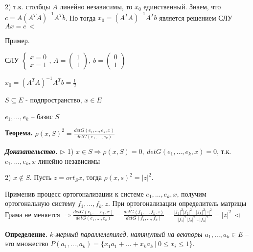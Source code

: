 \vspace{\baselineskip}
2) т.к. столбцы $A$ линейно независимы, то $x_0$ единственный. Знаем, что $c = A (A^T A)^{-1} A^T b$. Но тогда $x_0 = (A^T A)^{-1} A^T b$ является решением СЛУ $Ax = c \ \lhd$

\vspace{\baselineskip}
Пример.

СЛУ $\begin{cases}
		x = 0 \\
		x = 1
	\end{cases}$, $A = \begin{pmatrix} 1 \\ 1 \end{pmatrix}, \ b = \begin{pmatrix} 0 \\ 1 \end{pmatrix}$

\vspace{\baselineskip}
$x_0 = (A^T A)^{-1} A^T b = \frac{1}{2}$

\vspace{\baselineskip}
$S \subseteq E$ - подпространство, $x \in E$

$e_1, \dots, e_k$ -- базис $S$

\vspace{\baselineskip}
\textbf{Теорема.} $\rho (x, S)^2 = \frac{det G(e_1, \dots, e_k, x)}{det G(e_1, \dots, e_k)}$

\vspace{\baselineskip}
\textbf{\textit{Доказательство.}} $\rhd$ 1) $x \in S \Rightarrow \rho (x, S) = 0, \ det G(e_1, \dots, e_k, x) = 0$, т.к. $e_1, \dots, e_k, x$ линейно независимы

\vspace{\baselineskip}
2) $x \notin S$. Пусть $z = ort_S x$, тогда $\rho(x, s)^2 = |z|^2$.

Применив процесс ортогонализации к системе $e_1, \dots, e_k, x$, получим ортогональную систему $f_1, \dots, f_k, z$. При ортогонализации определитель матрицы Грама не меняется $\Rightarrow \frac{det G(e_1, \dots, e_k, x)}{det G(e_1, \dots, e_k)} = \frac{det G(f_1, \dots, f_k, z)}{det G(f_1, \dots, f_k)} = \frac{|f_1|^2 |f_2|^2 \dots |f_k|^2 |z|^2}{|f_1|^2 |f_2|^2 \dots |f_k|^2} = |z|^2 \ \lhd$

\vspace{\baselineskip}
\textbf{Определение.} \textit{$k$-мерный параллелепипед, натянутый на векторы $a_1, \dots, a_k \in E$} -- это множество $P(a_1, \dots, a_k) = \{ x_1 a_1 + \dots + x_k a_k \ | \ 0 \leq x_i \leq 1 \}$. 


